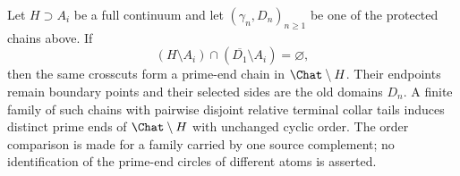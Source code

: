 \begin{lemma}\label{lem:crosscut-survival}
Let $H\supset A_i$ be a full continuum and let $(\gamma_n,D_n)_{n\ge1}$ be
one of the protected chains above.  If
\[
(H\setminus A_i)\cap(\overline{D_1}\setminus A_i)=\varnothing,
\]
then the same crosscuts form a prime-end chain in
$\Chat\setminus H$.  Their endpoints remain boundary points and their
selected sides are the old domains $D_n$.  A finite family of such chains with
pairwise disjoint relative terminal collar tails induces distinct prime
ends of $\Chat\setminus H$ with unchanged cyclic order.  The order
comparison is made for a family carried by one source complement; no
identification of the prime-end circles of different atoms is asserted.
\end{lemma}

